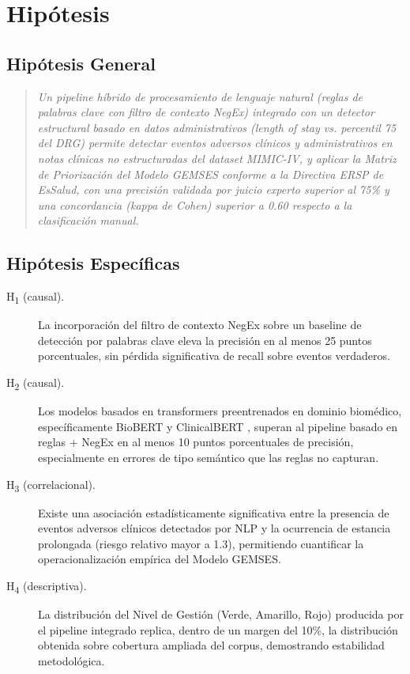 \section{Hipótesis}

\subsection*{Hipótesis General}

\begin{quote}
\textit{Un pipeline híbrido de procesamiento de lenguaje natural (reglas de palabras clave con filtro de contexto NegEx) integrado con un detector estructural basado en datos administrativos (length of stay vs. percentil 75 del DRG) permite detectar eventos adversos clínicos y administrativos en notas clínicas no estructuradas del dataset MIMIC-IV, y aplicar la Matriz de Priorización del Modelo GEMSES conforme a la Directiva ERSP de EsSalud, con una precisión validada por juicio experto superior al 75\% y una concordancia (kappa de Cohen) superior a 0.60 respecto a la clasificación manual.}
\end{quote}

\subsection*{Hipótesis Específicas}

\begin{description}
    \item[H\textsubscript{1} (causal).] La incorporación del filtro de contexto NegEx \citep{chapman2001negex} sobre un baseline de detección por palabras clave eleva la precisión en al menos 25 puntos porcentuales, sin pérdida significativa de recall sobre eventos verdaderos.
    \item[H\textsubscript{2} (causal).] Los modelos basados en transformers preentrenados en dominio biomédico, específicamente BioBERT \citep{lee2020biobert} y ClinicalBERT \citep{alsentzer2019clinicalbert}, superan al pipeline basado en reglas + NegEx en al menos 10 puntos porcentuales de precisión, especialmente en errores de tipo semántico que las reglas no capturan.
    \item[H\textsubscript{3} (correlacional).] Existe una asociación estadísticamente significativa entre la presencia de eventos adversos clínicos detectados por NLP y la ocurrencia de estancia prolongada (riesgo relativo mayor a 1.3), permitiendo cuantificar la operacionalización empírica del Modelo GEMSES.
    \item[H\textsubscript{4} (descriptiva).] La distribución del Nivel de Gestión (Verde, Amarillo, Rojo) producida por el pipeline integrado replica, dentro de un margen del 10\%, la distribución obtenida sobre cobertura ampliada del corpus, demostrando estabilidad metodológica.
\end{description}

